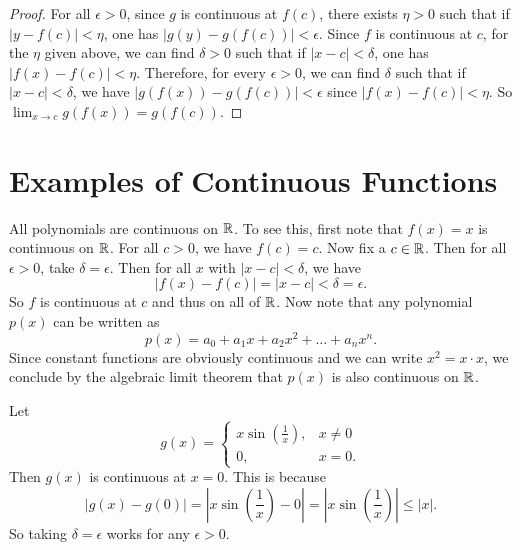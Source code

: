 \begin{proof}
  For all $\epsilon > 0$, since $g$ is continuous at $f(c)$, there
  exists $\eta > 0$ such that if $|y - f(c)| < \eta$,
  one has $|g(y) - g(f(c))| < \epsilon$. Since $f$ is continuous
  at $c$, for the $\eta$ given above, we can find $\delta > 0$
  such that if $|x - c| < \delta$, one has
  $|f(x) - f(c)| < \eta$. Therefore, for every $\epsilon > 0$,
  we can find $\delta$ such that if $|x - c| < \delta$, we have
  $|g(f(x)) - g(f(c))| < \epsilon$ since $|f(x) - f(c)| < \eta$.
  So $\lim_{x \to c} g(f(x)) = g(f(c))$.
\end{proof}

\section{Examples of Continuous Functions}
\begin{example}
  All polynomials are continuous on $\mathbb{R}$. To see this, first note
  that $f(x) = x$ is continuous on $\mathbb{R}$. For all $c > 0$, we have
  $f(c) = c$. Now fix a $c \in \mathbb{R}$. Then for all $\epsilon > 0$,
  take $\delta = \epsilon$. Then for all $x$ with
  $|x - c| < \delta$, we have
  \[|f(x) - f(c)| = |x - c| < \delta = \epsilon.\]
  So $f$ is continuous at $c$ and thus on all of $\mathbb{R}$. Now note
  that any
  polynomial $p(x)$ can be written as
  \[p(x) = a_0 + a_1 x + a_2x^2 + \dots + a_nx^n.\]
  Since constant functions are obviously continuous and we can
  write $x^2 = x \cdot x$, we conclude by the algebraic limit
  theorem that $p(x)$ is also continuous on $\mathbb{R}$.
\end{example}

\begin{example}
  Let
  \[
    g(x) = \begin{cases}
      x \sin(\frac{1}{x}), & x \ne 0 \\
      0, & x = 0.
    \end{cases}
  \]
  Then $g(x)$ is continuous at $x = 0$. This is because
  \[
  |g(x) - g(0)| = \left|x \sin\left(\frac{1}{x}\right) - 0\right|
  = \left|x\sin\left(\frac{1}{x}\right)\right| \le |x|
  .\]
  So taking $\delta = \epsilon$ works for any $\epsilon > 0$.
\end{example}

